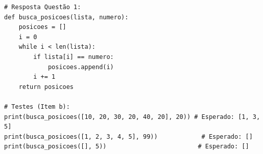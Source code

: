 \ifmostrarGabarito
\begin{verbatim}
# Resposta Questão 1:
def busca_posicoes(lista, numero):
    posicoes = []
    i = 0
    while i < len(lista):
        if lista[i] == numero:
            posicoes.append(i)
        i += 1
    return posicoes

# Testes (Item b):
print(busca_posicoes([10, 20, 30, 20, 40, 20], 20)) # Esperado: [1, 3, 5]
print(busca_posicoes([1, 2, 3, 4, 5], 99))            # Esperado: []
print(busca_posicoes([], 5))                         # Esperado: []
\end{verbatim}
\fi
